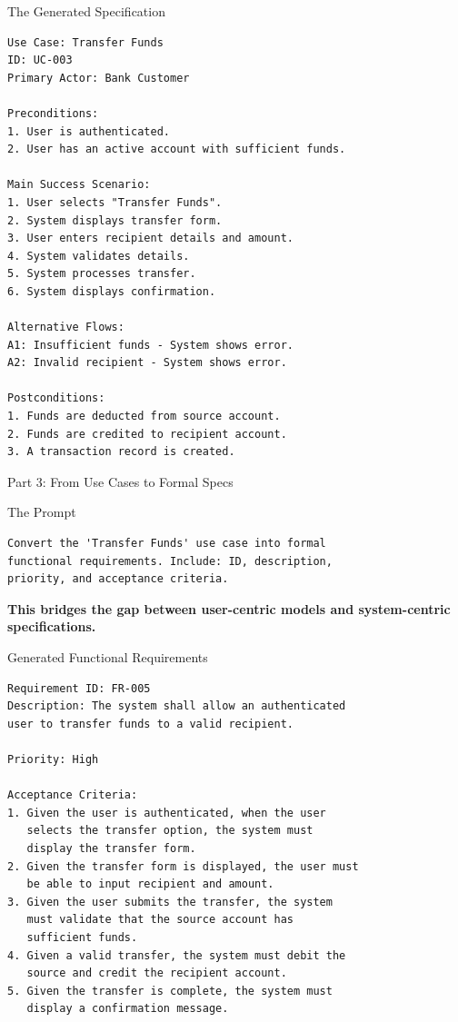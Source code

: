 \documentclass{beamer}
\begin{document}
\begin{frame}[fragile]{The Generated Specification}
    \lstset{style=code}
    \begin{lstlisting}[caption={Transfer Funds Use Case Specification}]
Use Case: Transfer Funds
ID: UC-003
Primary Actor: Bank Customer

Preconditions:
1. User is authenticated.
2. User has an active account with sufficient funds.

Main Success Scenario:
1. User selects "Transfer Funds".
2. System displays transfer form.
3. User enters recipient details and amount.
4. System validates details.
5. System processes transfer.
6. System displays confirmation.

Alternative Flows:
A1: Insufficient funds - System shows error.
A2: Invalid recipient - System shows error.

Postconditions:
1. Funds are deducted from source account.
2. Funds are credited to recipient account.
3. A transaction record is created.
    \end{lstlisting}
\end{frame}

\begin{frame}[fragile]{Part 3: From Use Cases to Formal Specs}
    \begin{block}{The Prompt}
        \lstset{style=code}
        \begin{lstlisting}
Convert the 'Transfer Funds' use case into formal 
functional requirements. Include: ID, description, 
priority, and acceptance criteria.
        \end{lstlisting}
    \end{block}
    
    \textbf{This bridges the gap between user-centric models and system-centric specifications.}
\end{frame}

\begin{frame}[fragile]{Generated Functional Requirements}
    \lstset{style=code}
    \begin{lstlisting}[caption={Functional Requirements Specification}]
Requirement ID: FR-005
Description: The system shall allow an authenticated 
user to transfer funds to a valid recipient.

Priority: High

Acceptance Criteria:
1. Given the user is authenticated, when the user 
   selects the transfer option, the system must 
   display the transfer form.
2. Given the transfer form is displayed, the user must
   be able to input recipient and amount.
3. Given the user submits the transfer, the system
   must validate that the source account has 
   sufficient funds.
4. Given a valid transfer, the system must debit the
   source and credit the recipient account.
5. Given the transfer is complete, the system must
   display a confirmation message.
    \end{lstlisting}
\end{frame}
\end{document}
